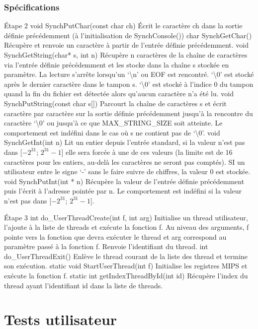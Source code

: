 \documentclass{book}
\begin{document}
\section{Spécifications}
Étape 2
void SynchPutChar(const char ch)
Écrit le caractère ch dans la sortie définie précédemment (à l’initialisation de SynchConsole())
char SynchGetChar()
Récupère et renvoie un caractère à partir de l’entrée définie précédemment.
void SynchGetString(char* s, int n)
Récupère n caractères de la chaîne de caractères via l’entrée définie précédemment et les stocke dans la chaîne s stockée en paramètre. La lecture s’arrête lorsqu’un ‘\textbackslash n’ ou EOF est rencontré.
‘\textbackslash 0’ est stocké après le dernier caractère dans le tampon s.
‘\textbackslash 0’ est stocké à l’indice 0 du tampon quand la fin du fichier est détectée alors qu’aucun caractère n’a été lu.
void SynchPutString(const char s[])
Parcourt la chaîne de caractères s et écrit caractère par caractère sur la sortie définie précédemment jusqu’à la rencontre du caractère ‘\textbackslash 0’ ou jusqu’à ce que MAX\_STRING\_SIZE soit atteinte. Le comportement est indéfini dans le cas où s ne contient pas de ‘\textbackslash 0’.
void SynchGetInt(int n)
Lit un entier depuis l'entrée standard, si la valeur n'est pas dans [$-2^{31}$; $2^{31}-1$] elle sera forcée à une de ces valeurs (la limite est de 16 caractères pour les entiers, au-delà les caractères ne seront pas comptés). SI un utilisateur entre le signe ‘-’ sans le faire suivre de chiffres, la valeur 0 est stockée.
void SynchPutInt(int * n)
Récupère la valeur de l’entrée définie précédemment puis l’écrit à l’adresse pointée par n. Le comportement est indéfini si la valeur n'est pas dans [$-2^{31}$; $2^{31}-1$].

\'Etape 3
int do\_UserThreadCreate(int f, int arg)
Initialise un thread utilisateur, l’ajoute à la liste de threads et exécute la fonction f. Au niveau des arguments, f pointe vers la fonction que devra exécuter le thread et arg correspond au paramètre passé à la fonction f. Renvoie l’identifiant du thread.
int do\_UserThreadExit()
Enlève le thread courant de la liste des thread et termine son exécution.
static void StartUserThread(int f)
Initialise les registres MIPS et exécute la fonction f.
static int getIndexThreadById(int id)
Récupère l’index du thread ayant l’identifiant id dans la liste de threads.



\part{Tests utilisateur}
\end{document}
